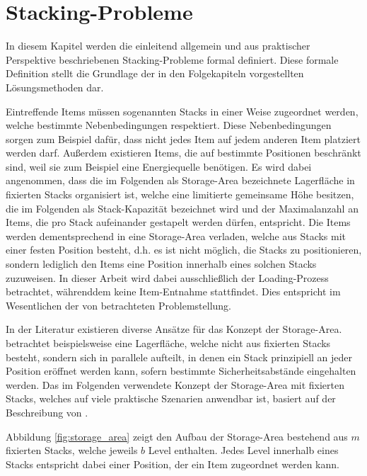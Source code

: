 \section{Stacking-Probleme}
\label{sec:stacking_problems}

In diesem Kapitel werden die einleitend allgemein und aus praktischer Perspektive beschriebenen Stacking-Probleme
formal definiert. Diese formale Definition stellt die Grundlage der in den Folgekapiteln vorgestellten Lösungsmethoden dar.

Eintreffende Items müssen sogenannten Stacks in einer Weise zugeordnet werden, welche bestimmte Nebenbedingungen respektiert.
Diese Nebenbedingungen sorgen zum Beispiel dafür, dass nicht jedes Item auf jedem anderen Item platziert werden
darf. Außerdem existieren Items, die auf bestimmte Positionen beschränkt sind, weil sie zum Beispiel eine Energiequelle benötigen. Es wird dabei angenommen, dass die im Folgenden als Storage-Area bezeichnete Lagerfläche in fixierten
Stacks organisiert ist, welche eine limitierte gemeinsame Höhe besitzen, die im Folgenden als Stack-Kapazität bezeichnet wird
und der Maximalanzahl an Items, die pro Stack aufeinander gestapelt werden dürfen, entspricht.
Die Items werden dementsprechend in eine Storage-Area verladen, welche aus Stacks mit einer festen Position besteht,
d.h. es ist nicht möglich, die Stacks zu positionieren, sondern lediglich den Items eine Position innerhalb eines solchen
Stacks zuzuweisen. In dieser Arbeit wird dabei ausschließlich der Loading-Prozess betrachtet, währenddem keine
Item-Entnahme stattfindet. Dies entspricht im Wesentlichen der von \citet{Bruns2015} betrachteten Problemstellung.

In der Literatur existieren diverse Ansätze für das Konzept der Storage-Area.
\citet{Jaehn2013} betrachtet beispielsweise eine Lagerfläche, welche nicht aus fixierten Stacks besteht,
sondern sich in parallele  aufteilt, in denen ein Stack prinzipiell an jeder Position eröffnet werden kann, sofern bestimmte Sicherheitsabstände eingehalten werden.
Das im Folgenden verwendete Konzept der Storage-Area mit fixierten Stacks, welches auf viele praktische
Szenarien anwendbar ist, basiert auf der Beschreibung von \citet{Lehnfeld2014}.

Abbildung \ref{fig:storage_area} zeigt den Aufbau der Storage-Area bestehend aus $m$ fixierten
Stacks, welche jeweils $b$ Level enthalten. Jedes Level innerhalb eines Stacks entspricht dabei einer Position,
der ein Item zugeordnet werden kann.

